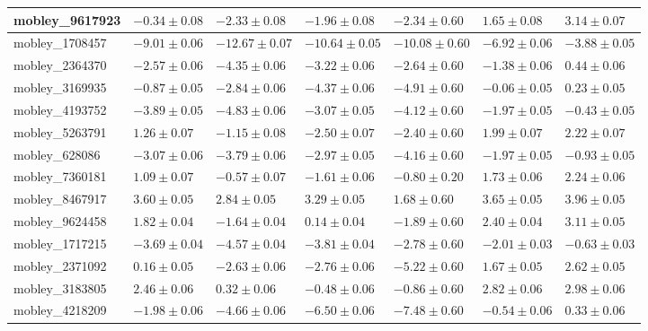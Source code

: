 \documentclass{article}
\begin{document}
\begin{landscape}
\begin{longtable}{|l{3.0cm}|l{3.0cm}|l{3.2cm}|l{3.6cm}|l{3.0cm}|l{3.0cm}|l{3.0cm}|}
mobley\_9617923	&	$	-0.34	\pm	0.08	$	&	$	-2.33	\pm	0.08	$	&	$	-1.96	\pm	0.08	$	&	$	-2.34	\pm	0.60	$	&	$	1.65	\pm	0.08	$	&	$	3.14	\pm	0.07	$	\\ \hline
mobley\_1708457	&	$	-9.01	\pm	0.06	$	&	$	-12.67	\pm	0.07	$	&	$	-10.64	\pm	0.05	$	&	$	-10.08	\pm	0.60	$	&	$	-6.92	\pm	0.06	$	&	$	-3.88	\pm	0.05	$	\\ \hline
mobley\_2364370	&	$	-2.57	\pm	0.06	$	&	$	-4.35	\pm	0.06	$	&	$	-3.22	\pm	0.06	$	&	$	-2.64	\pm	0.60	$	&	$	-1.38	\pm	0.06	$	&	$	0.44	\pm	0.06	$	\\ \hline
mobley\_3169935	&	$	-0.87	\pm	0.05	$	&	$	-2.84	\pm	0.06	$	&	$	-4.37	\pm	0.06	$	&	$	-4.91	\pm	0.60	$	&	$	-0.06	\pm	0.05	$	&	$	0.23	\pm	0.05	$	\\ \hline
mobley\_4193752	&	$	-3.89	\pm	0.05	$	&	$	-4.83	\pm	0.06	$	&	$	-3.07	\pm	0.05	$	&	$	-4.12	\pm	0.60	$	&	$	-1.97	\pm	0.05	$	&	$	-0.43	\pm	0.05	$	\\ \hline
mobley\_5263791	&	$	1.26	\pm	0.07	$	&	$	-1.15	\pm	0.08	$	&	$	-2.50	\pm	0.07	$	&	$	-2.40	\pm	0.60	$	&	$	1.99	\pm	0.07	$	&	$	2.22	\pm	0.07	$	\\ \hline
mobley\_628086	&	$	-3.07	\pm	0.06	$	&	$	-3.79	\pm	0.06	$	&	$	-2.97	\pm	0.05	$	&	$	-4.16	\pm	0.60	$	&	$	-1.97	\pm	0.05	$	&	$	-0.93	\pm	0.05	$	\\ \hline
mobley\_7360181	&	$	1.09	\pm	0.07	$	&	$	-0.57	\pm	0.07	$	&	$	-1.61	\pm	0.06	$	&	$	-0.80	\pm	0.20	$	&	$	1.73	\pm	0.06	$	&	$	2.24	\pm	0.06	$	\\ \hline
mobley\_8467917	&	$	3.60	\pm	0.05	$	&	$	2.84	\pm	0.05	$	&	$	3.29	\pm	0.05	$	&	$	1.68	\pm	0.60	$	&	$	3.65	\pm	0.05	$	&	$	3.96	\pm	0.05	$	\\ \hline
mobley\_9624458	&	$	1.82	\pm	0.04	$	&	$	-1.64	\pm	0.04	$	&	$	0.14	\pm	0.04	$	&	$	-1.89	\pm	0.60	$	&	$	2.40	\pm	0.04	$	&	$	3.11	\pm	0.05	$	\\ \hline
mobley\_1717215	&	$	-3.69	\pm	0.04	$	&	$	-4.57	\pm	0.04	$	&	$	-3.81	\pm	0.04	$	&	$	-2.78	\pm	0.60	$	&	$	-2.01	\pm	0.03	$	&	$	-0.63	\pm	0.03	$	\\ \hline
mobley\_2371092	&	$	0.16	\pm	0.05	$	&	$	-2.63	\pm	0.06	$	&	$	-2.76	\pm	0.06	$	&	$	-5.22	\pm	0.60	$	&	$	1.67	\pm	0.05	$	&	$	2.62	\pm	0.05	$	\\ \hline
mobley\_3183805	&	$	2.46	\pm	0.06	$	&	$	0.32	\pm	0.06	$	&	$	-0.48	\pm	0.06	$	&	$	-0.86	\pm	0.60	$	&	$	2.82	\pm	0.06	$	&	$	2.98	\pm	0.06	$	\\ \hline
mobley\_4218209	&	$	-1.98	\pm	0.06	$	&	$	-4.66	\pm	0.06	$	&	$	-6.50	\pm	0.06	$	&	$	-7.48	\pm	0.60	$	&	$	-0.54	\pm	0.06	$	&	$	0.33	\pm	0.06	$	\\ \hline

\end{longtable}
\end{landscape}
\end{document}
